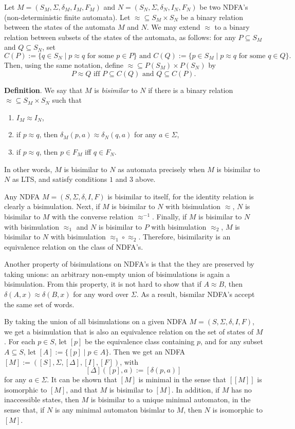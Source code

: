 \documentclass[12pt]{article}
\begin{document}
Let $M=(S_M,\Sigma,\delta_M,I_M,F_M)$ and $N=(S_N,\Sigma,\delta_N,I_N,F_N)$ be two NDFA's (non-deterministic finite automata).  Let $\approx \subseteq S_M \times S_N$ be a binary relation between the states of the automata $M$ and $N$.  We may extend $\approx$ to a binary relation between subsets of the states of the automata, as follows: for any $P\subseteq S_M$ and $Q \subseteq S_N$, set
$$C(P):=\lbrace q\in S_N\mid p\approx q\mbox{ for some }p\in P\rbrace\mbox{ and }C(Q):=\lbrace p\in S_M\mid p\approx q\mbox{ for some }q\in Q\rbrace.$$
Then, using the same notation, define $\approx \subseteq P(S_M)\times P(S_N)$ by
$$P \approx Q \mbox{ iff }P \subseteq C(Q)\mbox{ and }Q \subseteq C(P).$$

\textbf{Definition}.  We say that $M$ is \emph{bisimilar} to $N$ if there is a binary relation $\approx \subseteq S_M \times S_N$ such that
\begin{enumerate}
\item $I_M \approx I_N$,
\item if $p \approx q$, then $\delta_M(p,a) \approx \delta_N(q,a)$ for any $a\in \Sigma$,
\item if $p \approx q$, then $p\in F_M$ iff $q\in F_N$.
\end{enumerate}
In other words, $M$ is bisimilar to $N$ as automata precisely when $M$ is bisimilar to $N$ as LTS, and satisfy conditions $1$ and $3$ above.

Any NDFA $M=(S,\Sigma,\delta,I,F)$ is bisimilar to itself, for the identity relation is clearly a bisimulation.  Next, if $M$ is bisimilar to $N$ with bisimulation $\approx$, $N$ is bisimilar to $M$ with the converse relation $\approx^{-1}$.  Finally, if $M$ is bisimilar to $N$ with bisimulation $\approx_1$ and $N$ is bisimilar to $P$ with bisimulation $\approx_2$, $M$ is bisimilar to $N$ with bisimulation $\approx_1\circ \approx_2$.  Therefore, bisimilarity is an equivalence relation on the class of NDFA's.

Another property of bisimulations on NDFA's is that the they are preserved by taking unions: an arbitrary non-empty union of bisimulations is again a bisimulation.  From this property, it is not hard to show that if $A\approx B$, then $\delta(A,x)\approx \delta(B,x)$ for any word over $\Sigma$.  As a result, bismilar NDFA's accept the same set of words.

By taking the union of all bisimulations on a given NDFA $M=(S,\Sigma,\delta,I,F)$, we get a bisimulation that is also an equivalence relation on the set of states of $M$.  For each $p\in S$, let $[p]$ be the equivalence class containing $p$, and for any subset $A\subseteq S$, let $[A]:=\lbrace [p]\mid p\in A\rbrace$.  Then we get an NDFA $[M]:=([S],\Sigma,[\Delta],[I],[F])$, with $$[\Delta]([p],a):=[\delta(p,a)]$$ for any $a\in \Sigma$.  It can be shown that $[M]$ is minimal in the sense that $[[M]]$ is isomorphic to $[M]$, and that $M$ is bisimilar to $[M]$.  In addition, if $M$ has no inaccessible states, then $M$ is bisimilar to a unique minimal automaton, in the sense that, if $N$ is any minimal automaton bisimlar to $M$, then $N$ is isomorphic to $[M]$.

\end{document}
